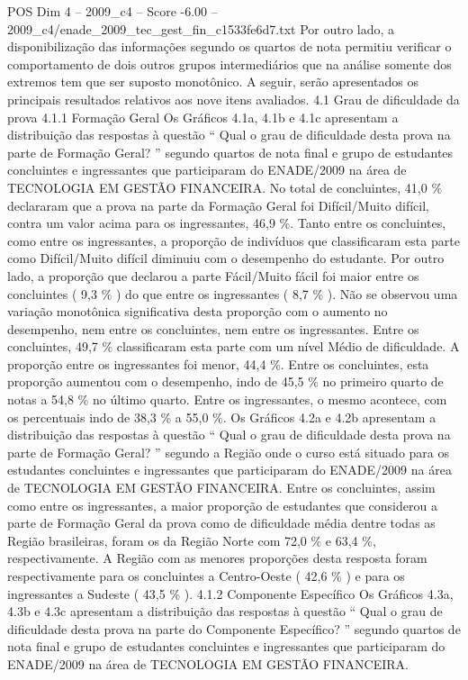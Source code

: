 \begin{textsample}{POS Dim 4 – 2009\_c4 – Score -6.00 – 2009\_c4/enade\_2009\_tec\_gest\_fin\_c1533fe6d7.txt}
Por outro lado, a disponibilização das informações segundo os quartos de nota permitiu verificar o comportamento de dois outros grupos intermediários que na análise somente dos extremos tem que ser suposto monotônico.
A seguir, serão apresentados os principais resultados relativos aos nove itens avaliados. 4.1 Grau de dificuldade da prova 4.1.1 Formação Geral Os Gráficos 4.1a, 4.1b e 4.1c apresentam a distribuição das respostas à questão “ Qual o grau de dificuldade desta prova na parte de Formação Geral? ” segundo quartos de nota final e grupo de estudantes concluintes e ingressantes que participaram do ENADE/2009 na área de TECNOLOGIA EM GESTÃO FINANCEIRA.
No total de concluintes, 41,0 \% declararam que a prova na parte da Formação Geral foi Difícil/Muito difícil, contra um valor acima para os ingressantes, 46,9 \%.
Tanto entre os concluintes, como entre os ingressantes, a proporção de indivíduos que classificaram esta parte como Difícil/Muito difícil diminuiu com o desempenho do estudante.
Por outro lado, a proporção que declarou a parte Fácil/Muito fácil foi maior entre os concluintes ( 9,3 \% ) do que entre os ingressantes ( 8,7 \% ).
Não se observou uma variação monotônica significativa desta proporção com o aumento no desempenho, nem entre os concluintes, nem entre os ingressantes.
Entre os concluintes, 49,7 \% classificaram esta parte com um nível Médio de dificuldade.
A proporção entre os ingressantes foi menor, 44,4 \%.
Entre os concluintes, esta proporção aumentou com o desempenho, indo de 45,5 \% no primeiro quarto de notas a 54,8 \% no último quarto.
Entre os ingressantes, o mesmo acontece, com os percentuais indo de 38,3 \% a 55,0 \%.
Os Gráficos 4.2a e 4.2b apresentam a distribuição das respostas à questão “ Qual o grau de dificuldade desta prova na parte de Formação Geral? ” segundo a Região onde o curso está situado para os estudantes concluintes e ingressantes que participaram do ENADE/2009 na área de TECNOLOGIA EM GESTÃO FINANCEIRA.
Entre os concluintes, assim como entre os ingressantes, a maior proporção de estudantes que considerou a parte de Formação Geral da prova como de dificuldade média dentre todas as Região brasileiras, foram os da Região Norte com 72,0 \% e 63,4 \%, respectivamente.
A Região com as menores proporções desta resposta foram respectivamente para os concluintes a Centro-Oeste ( 42,6 \% ) e para os ingressantes a Sudeste ( 43,5 \% ). 4.1.2 Componente Específico Os Gráficos 4.3a, 4.3b e 4.3c apresentam a distribuição das respostas à questão “ Qual o grau de dificuldade desta prova na parte do Componente Específico? ” segundo quartos de nota final e grupo de estudantes concluintes e ingressantes que participaram do ENADE/2009 na área de TECNOLOGIA EM GESTÃO FINANCEIRA.

\end{textsample}
